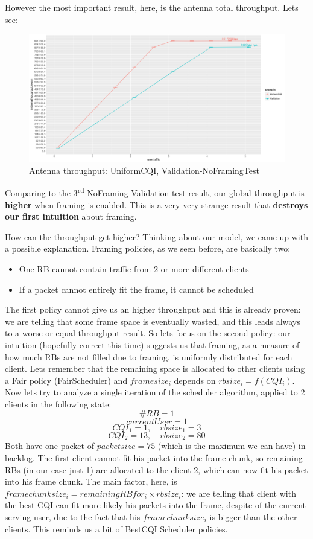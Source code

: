 However the most important result, here, is the antenna total throughput. Lets see:
\begin{figure}[H]
  \includegraphics[width=1\textwidth]{images/thantenna1}
  \caption{Antenna throughput: UniformCQI, Validation-NoFramingTest}
  \label{fig:Antenna throughput: UniformCQI, Validation-NoFramingTest}
\end{figure}

Comparing to the 3\textsuperscript{rd} NoFraming Validation test result, our global throughput is \textbf{higher} when framing is enabled. This is a very very strange result that \textbf{destroys our first intuition} about framing.

How can the throughput get higher? Thinking about our model, we came up with a possible explanation. Framing policies, as we seen before, are basically two:
\begin{itemize}
	\item One RB cannot contain traffic from 2 or more different clients
	\item If a packet cannot entirely fit the frame, it cannot be scheduled
\end{itemize}
The first policy cannot give us an higher throughput and this is already proven: we are telling that some frame space is eventually wasted, and this leads always to a worse or equal throughput result. So lets focus on the second policy: our intuition (hopefully correct this time) suggests us that framing, as a measure of how much RBs are not filled due to framing, is uniformly distributed for each client. Lets remember that the remaining space is allocated to other clients using a Fair policy (FairScheduler) and \(framesize_i\) depends on \(rbsize_i = f(CQI_i)\). Now lets try to analyze a single iteration of the scheduler algorithm, applied to 2 clients in the following state:
\[\#RB = 1\]
\[currentUser = 1\]
\[CQI_1 = 1, \quad rbsize_1 = 3\]
\[CQI_2 = 13, \quad rbsize_2 = 80\]
Both have one packet of \(packetsize=75\) (which is the maximum we can have) in backlog. The first client cannot fit his packet into the frame chunk, so remaining RBs (in our case just 1) are allocated to the client 2, which can now fit his packet into his frame chunk. The main factor, here, is \(framechunksize_i = remainingRBfor_i \times rbsize_i\): we are telling that client with the best CQI can fit more likely his packets into the frame, despite of the current serving user, due to the fact that his \(framechunksize_i\) is bigger than the other clients. This reminds us a bit of BestCQI Scheduler policies.


